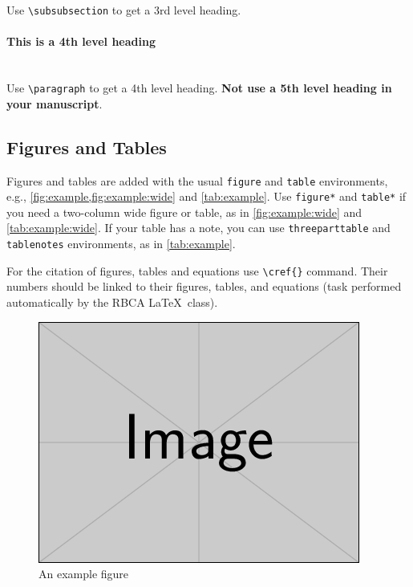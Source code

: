 \documentclass[alpha-refs,english]{RBCA_v3.0}
\begin{document}
Use \verb|\subsubsection| to get a 3rd level heading.


\paragraph{This is a 4th level heading}

~\\Use \verb|\paragraph| to get a 4th level heading. \textbf{Not use a 5th level heading in your manuscript}.


\subsection{Figures and Tables}
Figures and tables are added with the usual \verb|figure| and \verb|table| environments, e.g., \cref{fig:example,fig:example:wide} and \cref{tab:example}. Use \verb|figure*| and \verb|table*| if you need a two-column wide figure or table, as in \cref{fig:example:wide} and \cref{tab:example:wide}. If your table has a note, you can use \verb|threeparttable| and \verb|tablenotes| environments, as in \autoref{tab:example}.

For the citation of figures, tables and equations use \verb|\cref{}| command. Their numbers should be linked to their figures, tables, and equations (task performed automatically by the RBCA \LaTeX\ class).

\begin{figure}[bt!] %
\centering
\includegraphics[width=\linewidth]{example-image}
\caption{An example figure}\label{fig:example}
\end{figure}
\end{document}
